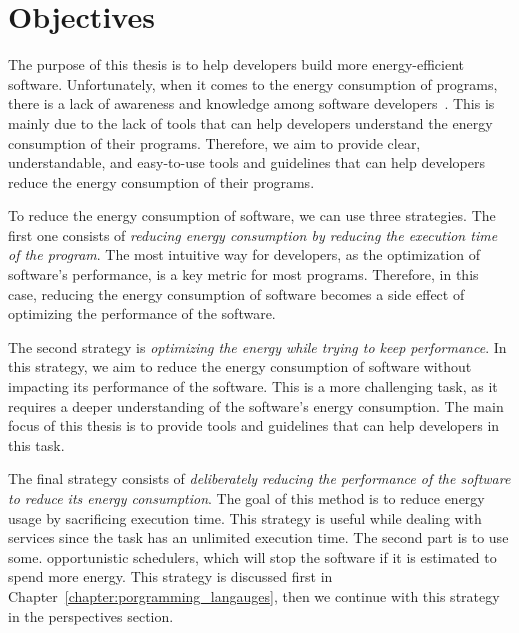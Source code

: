 \section{Objectives}
The purpose of this thesis is to help developers build more energy-efficient software.
Unfortunately, when it comes to the energy consumption of programs, there is a lack of awareness and knowledge among software developers~\cite{ournani2020reducing,pang2015programmers,pinto2014mining}.
This is mainly due to the lack of tools that can help developers understand the energy consumption of their programs.
Therefore, we aim to provide clear, understandable, and easy-to-use tools and guidelines that can help developers reduce the energy consumption of their programs.

To reduce the energy consumption of software, we can use three strategies.
The first one consists of \emph{reducing energy consumption by reducing the execution time of the program}.
The most intuitive way for developers, as the optimization of software's performance, is a key metric for most programs.
Therefore, in this case, reducing the energy consumption of software becomes a side effect of optimizing the performance of the software.

The second strategy is \emph{optimizing the energy while trying to keep performance}.
In this strategy, we aim to reduce the energy consumption of software without impacting its performance of the software.
This is a more challenging task, as it requires a deeper understanding of the software's energy consumption.
The main focus of this thesis is to provide tools and guidelines that can help developers in this task.

The final strategy consists of \emph{deliberately reducing the performance of the software to reduce its energy consumption}.
The goal of this method is to reduce energy usage by sacrificing execution time.
This strategy is useful while dealing with services since the task has an unlimited execution time.
The second part is to use some. opportunistic schedulers, which will stop the software if it is estimated to spend more energy.
This strategy is discussed first in Chapter~\ref{chapter:porgramming_langauges}, then we continue with this strategy in the perspectives section.

